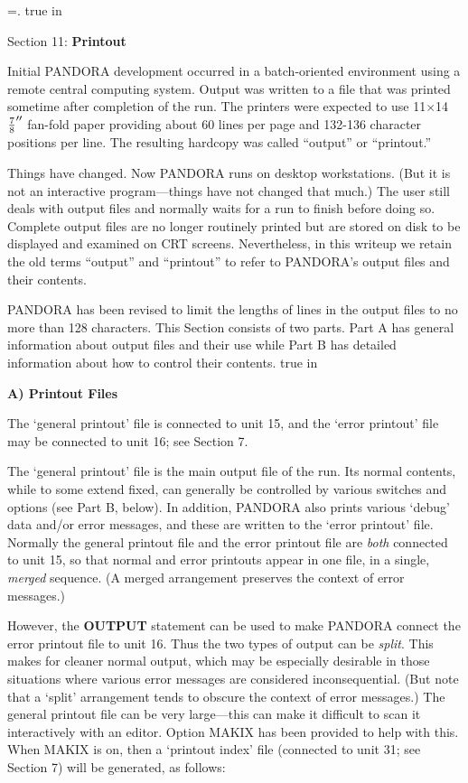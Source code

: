 %
\newtoks\footline \footline={\hss{}.\folio\hss}
\top
{} true in
\centerline{Section 11: {\bf Printout}}
\blankline
\blankline
Initial PANDORA development occurred in a batch-oriented environment
using a remote central computing system. Output was written to a file
that was printed sometime after completion of the run. The printers
were expected to use 11$\times$14${7\over8}''$ fan-fold paper providing
about 60 lines per page and 132-136 character positions per line.
The resulting hardcopy was called ``output'' or ``printout.''

Things have changed. Now PANDORA runs on desktop workstations. (But it
is not an interactive program---things have not changed that much.)
The user still deals with output files and normally waits for a run
to finish before doing so. Complete output files are no longer routinely
printed but are stored on disk to be displayed and examined on
CRT screens. Nevertheless, in this writeup we retain the old terms
``output'' and ``printout'' to refer to PANDORA's output files and
their contents.

PANDORA has been revised to limit the lengths of lines in the output
files to no more than 128 characters.
\blankline
This Section consists of two parts. Part A has general information
about output files and their use while Part B has detailed information
about how to control their contents.
\ej
\top
{} true in
\centerline{\bf A) Printout Files}
\blankline
The `general printout' file is connected to unit 15, and the `error printout'
file may be connected to unit 16; see Section 7.

The `general printout' file is the main output file of the run. Its normal
contents, while to some extend fixed, can generally be controlled by various
switches and options (see Part B, below). In addition, PANDORA also prints
various `debug' data and/or error messages, and these are written to the
`error printout' file. Normally the general printout file and the error
printout file are {\it both} connected to unit 15, so that normal and
error printouts appear in one file, in a single, {\it merged} sequence.
(A merged arrangement preserves the context of error messages.)

However, the {\bf OUTPUT} statement can be used to make PANDORA connect the
error printout file to unit 16. Thus the two types of output can be
{\it split}. This makes for cleaner normal output, which may be
especially desirable in those situations where various error messages are
considered inconsequential. (But note that a `split' arrangement tends to
obscure the context of error messages.)
\blankline
The general printout file can be very large---this can make it difficult to
scan it interactively with an editor. Option MAKIX has been provided
to help with this. When MAKIX is on, then a `printout index' file (connected
to unit 31; see Section 7) will be generated, as follows:

